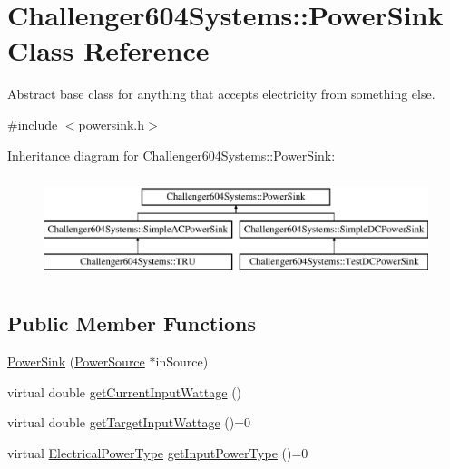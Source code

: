 \hypertarget{class_challenger604_systems_1_1_power_sink}{\section{Challenger604\-Systems\-:\-:Power\-Sink Class Reference}
\label{class_challenger604_systems_1_1_power_sink}
}


Abstract base class for anything that accepts electricity from something else.  




{\ttfamily \#include $<$powersink.\-h$>$}

Inheritance diagram for Challenger604\-Systems\-:\-:Power\-Sink\-:\begin{figure}[H]
\begin{center}
\leavevmode
\includegraphics[height=3.000000cm]{class_challenger604_systems_1_1_power_sink}
\end{center}
\end{figure}
\subsection*{Public Member Functions}
\begin{DoxyCompactItemize}
\item 
\hyperlink{class_challenger604_systems_1_1_power_sink_accbc82df84ef292c094f5b46fa5c7216}{Power\-Sink} (\hyperlink{class_challenger604_systems_1_1_power_source}{Power\-Source} $\ast$in\-Source)
\item 
virtual double \hyperlink{class_challenger604_systems_1_1_power_sink_ab0077d8a7e4120674802588eaa701d57}{get\-Current\-Input\-Wattage} ()
\item 
virtual double \hyperlink{class_challenger604_systems_1_1_power_sink_ade0817850ef945ba0751d757bceeee65}{get\-Target\-Input\-Wattage} ()=0
\item 
virtual \hyperlink{namespace_challenger604_systems_a9ad1a793d94b97514092692cb7315afd}{Electrical\-Power\-Type} \hyperlink{class_challenger604_systems_1_1_power_sink_aeb901bdc03e7c2c5cef0ccc3ff078a89}{get\-Input\-Power\-Type} ()=0
\end{DoxyCompactItemize}
